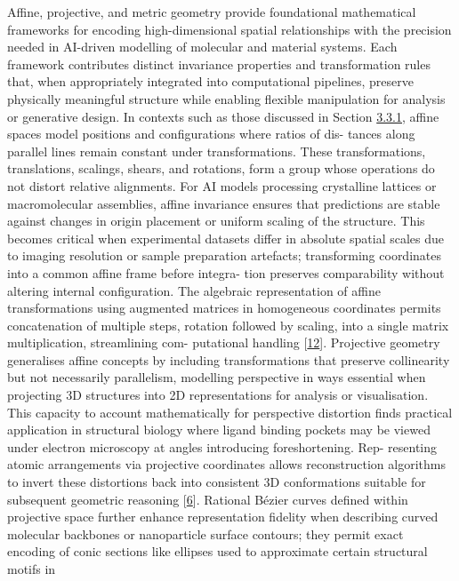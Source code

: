 \documentclass[
]{article}
\begin{document}
Affine, projective, and metric geometry provide foundational
mathematical frameworks for encoding high-dimensional spatial
relationships with the precision needed in AI-driven modelling of
molecular and material systems. Each framework contributes distinct
invariance properties and transformation rules that, when appropriately
integrated into computational pipelines, preserve physically meaningful
structure while enabling flexible manipulation for analysis or
generative design. In contexts such as those discussed in Section
\protect\hyperlink{combining-geometric-and-vector-representations}{3.3.1},
affine spaces model positions and configurations where ratios of dis-
tances along parallel lines remain constant under transformations. These
transformations, translations, scalings, shears, and rotations, form a
group whose operations do not distort relative alignments. For AI models
processing crystalline lattices or macromolecular assemblies, affine
invariance ensures that predictions are stable against changes in origin
placement or uniform scaling of the structure. This becomes critical
when experimental datasets differ in absolute spatial scales due to
imaging resolution or sample preparation artefacts; transforming
coordinates into a common affine frame before integra- tion preserves
comparability without altering internal configuration. The algebraic
representation of affine transformations using augmented matrices in
homogeneous coordinates permits concatenation of multiple steps,
rotation followed by scaling, into a single matrix multiplication,
streamlining com- putational handling
{[}\protect\hyperlink{_bookmark52}{12}{]}. Projective geometry
generalises affine concepts by including transformations that preserve
collinearity but not necessarily parallelism, modelling perspective in
ways essential when projecting 3D structures into 2D representations for
analysis or visualisation. This capacity to account mathematically for
perspective distortion finds practical application in structural biology
where ligand binding pockets may be viewed under electron microscopy at
angles introducing foreshortening. Rep- resenting atomic arrangements
via projective coordinates allows reconstruction algorithms to invert
these distortions back into consistent 3D conformations suitable for
subsequent geometric reasoning {[}\protect\hyperlink{_bookmark46}{6}{]}.
Rational Bézier curves defined within projective space further enhance
representation fidelity when describing curved molecular backbones or
nanoparticle surface contours; they permit exact encoding of conic
sections like ellipses used to approximate certain structural motifs in
\end{document}
